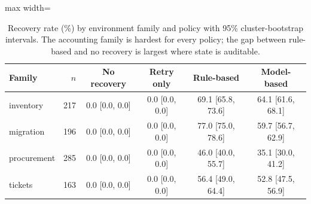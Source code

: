 \begin{table}[!ht]
\centering\scriptsize
\setlength{\tabcolsep}{4pt}
\caption{Recovery rate (\%) by environment family and policy with 95\% cluster-bootstrap intervals. The accounting family is hardest for every policy; the gap between rule-based and no recovery is largest where state is auditable.}
\label{tab:appendix_family}
\begin{adjustbox}{max width=\textwidth}
\begin{tabular}{@{}lrcccc@{}}
\toprule
Family & $n$ & No recovery & Retry only & Rule-based & Model-based \\
\midrule
inventory & 217 & 0.0 [0.0, 0.0] & 0.0 [0.0, 0.0] & 69.1 [65.8, 73.6] & 64.1 [61.6, 68.1] \\
migration & 196 & 0.0 [0.0, 0.0] & 0.0 [0.0, 0.0] & 77.0 [75.0, 78.6] & 59.7 [56.7, 62.9] \\
procurement & 285 & 0.0 [0.0, 0.0] & 0.0 [0.0, 0.0] & 46.0 [40.0, 55.7] & 35.1 [30.0, 41.2] \\
tickets & 163 & 0.0 [0.0, 0.0] & 0.0 [0.0, 0.0] & 56.4 [49.0, 64.4] & 52.8 [47.5, 56.9] \\
\bottomrule
\end{tabular}
\end{adjustbox}
\end{table}

